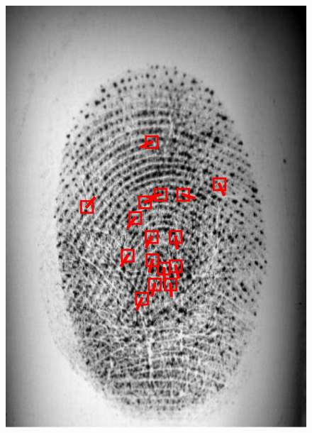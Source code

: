 \begin{figure}[htbp]
    \includegraphics[width=\figwidth\linewidth]{fig/minutiaenet/4.jpg}

\end{figure}
